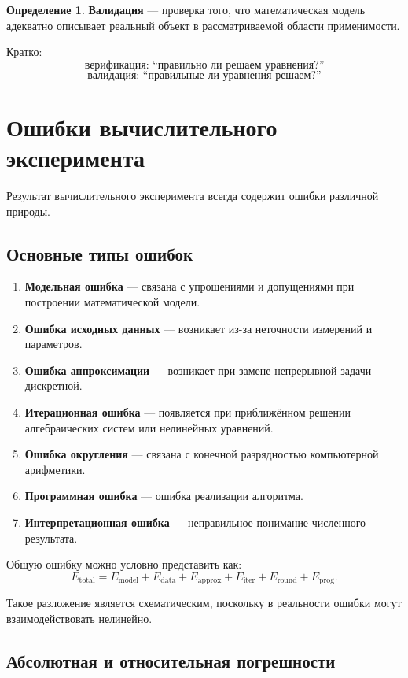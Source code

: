 \documentclass[12pt,a4paper]{article}
\theoremstyle{definition}
\newtheorem{definition}{Определение}
\theoremstyle{plain}
\begin{document}
\begin{definition}
\textbf{Валидация} --- проверка того, что математическая модель адекватно описывает реальный объект в рассматриваемой области применимости.
\end{definition}

Кратко:
\[
\text{верификация: ``правильно ли решаем уравнения?''}
\]
\[
\text{валидация: ``правильные ли уравнения решаем?''}
\]

\section{Ошибки вычислительного эксперимента}

Результат вычислительного эксперимента всегда содержит ошибки различной природы.

\subsection{Основные типы ошибок}

\begin{enumerate}
    \item \textbf{Модельная ошибка} --- связана с упрощениями и допущениями при построении математической модели.
    \item \textbf{Ошибка исходных данных} --- возникает из-за неточности измерений и параметров.
    \item \textbf{Ошибка аппроксимации} --- возникает при замене непрерывной задачи дискретной.
    \item \textbf{Итерационная ошибка} --- появляется при приближённом решении алгебраических систем или нелинейных уравнений.
    \item \textbf{Ошибка округления} --- связана с конечной разрядностью компьютерной арифметики.
    \item \textbf{Программная ошибка} --- ошибка реализации алгоритма.
    \item \textbf{Интерпретационная ошибка} --- неправильное понимание численного результата.
\end{enumerate}

Общую ошибку можно условно представить как:
\[
E_{\text{total}}
=
E_{\text{model}}
+
E_{\text{data}}
+
E_{\text{approx}}
+
E_{\text{iter}}
+
E_{\text{round}}
+
E_{\text{prog}}.
\]

Такое разложение является схематическим, поскольку в реальности ошибки могут взаимодействовать нелинейно.

\subsection{Абсолютная и относительная погрешности}
\end{document}
